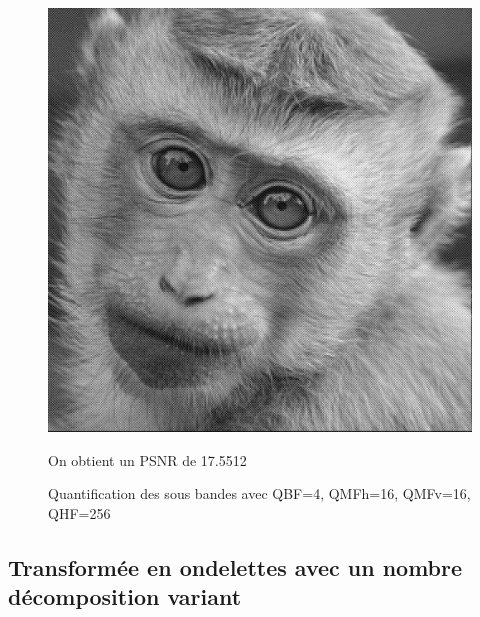 \documentclass{article}
\begin{document}
\begin{figure}[h!]
\centerline{ \includegraphics[scale=0.5]{./rendus/ReconstruiteQuantificationCoeff4_16_16_256.png} }
\caption{Quantification des sous bandes avec QBF=4, QMFh=16, QMFv=16, QHF=256} 
On obtient un PSNR de 17.5512
\end{figure}

\newpage
\subsection{Transformée en ondelettes avec un nombre décomposition variant}
\end{document}
